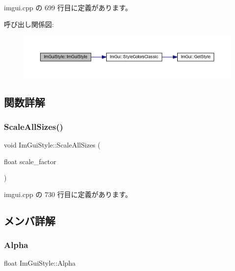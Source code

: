  imgui.\+cpp の 699 行目に定義があります。

呼び出し関係図\+:\nopagebreak
\begin{figure}[H]
\begin{center}
\leavevmode
\includegraphics[width=350pt]{struct_im_gui_style_ab0a3ffb3aeec3e6b09b9bde812b28369_cgraph}
\end{center}
\end{figure}


\subsection{関数詳解}
\mbox{\label{struct_im_gui_style_a7c9d3e0974a239f65e433cc952be0627}} 
\subsubsection{\texorpdfstring{Scale\+All\+Sizes()}{ScaleAllSizes()}}
{\footnotesize\ttfamily void Im\+Gui\+Style\+::\+Scale\+All\+Sizes (\begin{DoxyParamCaption}\item[{float}]{scale\+\_\+factor }\end{DoxyParamCaption})}



 imgui.\+cpp の 730 行目に定義があります。



\subsection{メンバ詳解}
\mbox{\label{struct_im_gui_style_a993312606e9dcb7ca165245150a4da72}} 
\subsubsection{\texorpdfstring{Alpha}{Alpha}}
{\footnotesize\ttfamily float Im\+Gui\+Style\+::\+Alpha}



